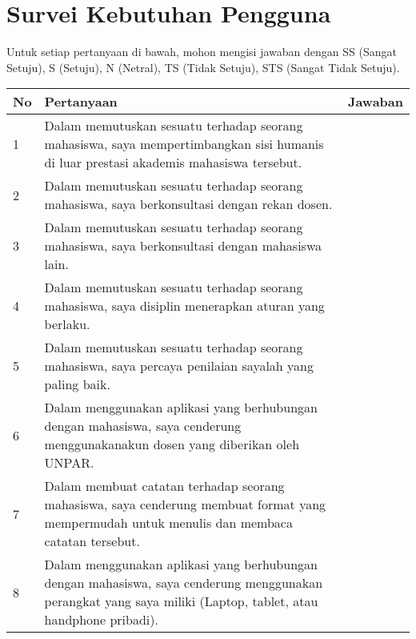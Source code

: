 \chapter{Survei Kebutuhan Pengguna}
\label{surveikebutuhanpengguna}

Untuk setiap pertanyaan di bawah, mohon mengisi jawaban dengan SS (Sangat Setuju), S (Setuju), N (Netral), TS (Tidak Setuju), STS (Sangat Tidak Setuju).

\begin{table}[h]
\centering
\begin{tabular}{|l|p{10cm}|l|}
\hline
No & Pertanyaan                                                                                                                                                    & Jawaban \\ \hline
1  & Dalam memutuskan sesuatu terhadap seorang mahasiswa, saya mempertimbangkan sisi humanis di luar prestasi akademis mahasiswa tersebut.                         &         \\ \hline
2  & Dalam memutuskan sesuatu terhadap seorang mahasiswa, saya berkonsultasi dengan rekan dosen.                                                                   &         \\ \hline
3  & Dalam memutuskan sesuatu terhadap seorang mahasiswa, saya berkonsultasi dengan mahasiswa lain.                                                                &         \\ \hline
4  & Dalam memutuskan sesuatu terhadap seorang mahasiswa, saya disiplin menerapkan aturan yang berlaku.                                                            &         \\ \hline
5  & Dalam memutuskan sesuatu terhadap seorang mahasiswa, saya percaya penilaian sayalah yang paling baik.                                                         &         \\ \hline
6  & Dalam menggunakan aplikasi yang berhubungan dengan mahasiswa, saya cenderung menggunakanakun dosen yang diberikan oleh UNPAR.                                 &         \\ \hline
7  & Dalam membuat catatan terhadap seorang mahasiswa, saya cenderung membuat format yang mempermudah untuk menulis dan membaca catatan tersebut.                  &         \\ \hline
8  & Dalam menggunakan aplikasi yang berhubungan dengan mahasiswa, saya cenderung menggunakan perangkat yang saya miliki (Laptop, tablet, atau handphone pribadi). &         \\ \hline
\end{tabular}
\end{table}